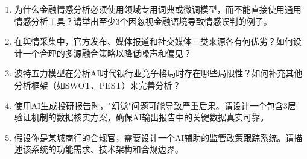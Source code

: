 \begin{exercisebox}[思考题]
\begin{enumerate}[leftmargin=2em]
  \item 为什么金融情感分析必须使用领域专用词典或微调模型，而不能直接使用通用情感分析工具？请举出至少3个因忽视金融语境导致情感误判的例子。
  \item 在舆情采集中，官方发布、媒体报道和社交媒体三类来源各有何优劣？如何设计一个合理的多源融合策略以降低噪声和偏见？
  \item 波特五力模型在分析AI时代银行业竞争格局时存在哪些局限性？如何补充其他分析框架（如SWOT、PEST）来完善分析？
  \item 使用AI生成投研报告时，"幻觉"问题可能导致严重后果。请设计一个包含3层验证机制的数据核实方案，确保AI输出报告中的关键数据真实可靠。
  \item 假设你是某城商行的合规官，需要设计一个AI辅助的监管政策跟踪系统。请描述该系统的功能需求、技术架构和合规边界。
\end{enumerate}
\end{exercisebox}

